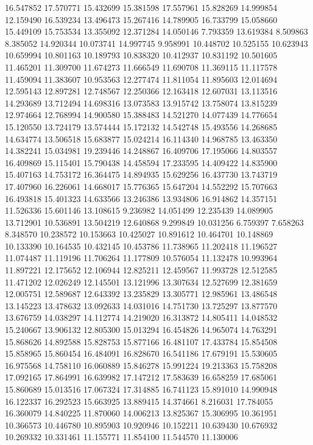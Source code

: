 16.547852
17.570771
15.432699
15.381598
17.557961
15.828269
14.999854
12.159490
16.539234
13.496473
15.267416
14.789905
16.733799
15.058660
15.449109
15.753534
13.355092
12.371284
14.050146
7.793359
13.619384
8.509863
8.385052
14.920344
10.073741
14.997745
9.958991
10.448702
10.525155
10.623943
10.659994
10.801163
10.189793
10.838320
10.412937
10.831192
10.501605
11.465201
11.309700
11.674273
11.666549
11.690708
11.369115
11.117578
11.459094
11.383607
10.953563
12.277474
11.811054
11.895603
12.014694
12.595143
12.897281
12.748567
12.250366
12.163418
12.607031
13.113516
14.293689
13.712494
14.698316
13.073583
13.915742
13.758074
13.815239
12.974664
12.768994
14.900580
15.388483
14.521270
14.077439
14.776654
15.120550
13.724179
13.574444
15.172132
14.542748
15.493556
14.268685
14.634774
13.506518
15.683877
15.024214
16.114340
14.968785
13.463350
14.382241
15.034981
19.239446
14.248867
16.409706
17.195066
14.803557
16.409869
15.115401
15.790438
14.458594
17.233595
14.409422
14.835900
15.407163
14.753172
16.364475
14.894935
15.629256
16.437730
13.743719
17.407960
16.226061
14.668017
15.776365
15.647204
14.552292
15.707663
16.493818
15.401323
14.633566
13.246386
13.934806
16.914862
14.357151
11.526336
15.601146
13.108615
9.236982
14.051499
12.235439
14.089905
13.712901
10.536891
13.504219
12.640868
9.299849
10.031256
6.759397
7.658263
8.348570
10.238572
10.153663
10.425027
10.891612
10.464701
10.148869
10.133390
10.164535
10.432145
10.453786
11.738965
11.202418
11.196527
11.074487
11.119196
11.706264
11.177809
10.576054
11.132478
10.993964
11.897221
12.175652
12.106944
12.825211
12.459567
11.993728
12.512585
11.471202
12.026249
12.145501
13.121996
13.307634
12.527699
12.381659
12.005751
12.589687
12.643392
13.235829
13.305771
12.985961
13.486548
13.145223
13.478632
13.092633
14.031016
14.751730
13.725297
13.877570
13.676759
14.038297
14.112774
14.219020
16.313872
14.805411
14.048532
15.240667
13.906132
12.805300
15.013294
16.454826
14.965074
14.763291
15.868626
14.892588
15.828753
15.877166
16.481107
17.433784
15.854508
15.858965
15.860454
16.484091
16.828670
16.541186
17.679191
15.530605
16.975568
14.758110
16.060889
15.846278
15.991224
19.213363
15.758208
17.092165
17.864991
16.639982
17.147212
17.583639
16.658259
17.685061
15.860689
15.013516
17.067324
17.314885
16.741123
15.891010
14.990948
16.122337
16.292523
15.663925
13.889415
14.374661
8.216031
17.784055
16.360079
14.840225
11.870060
14.006213
13.825367
15.306995
10.361951
10.366573
10.446780
10.895903
10.920946
10.152211
10.639430
10.676932
10.269332
10.331461
11.155771
11.854100
11.544570
11.130006
